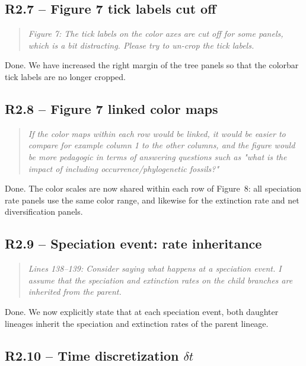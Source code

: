 \documentclass[11pt]{article}
\newenvironment{RC}{\begin{quote}\itshape}{\end{quote}}
\newcommand{\response}[1]{\noindent\textcolor{resp}{#1}\medskip}
\begin{document}
\subsection*{R2.7 -- Figure 7 tick labels cut off}

\begin{RC}
Figure 7: The tick labels on the color axes are cut off for some panels, which is a bit distracting. Please try to un-crop the tick labels.
\end{RC}

\response{Done. We have increased the right margin of the tree panels so that the colorbar tick labels are no longer cropped.}

\subsection*{R2.8 -- Figure 7 linked color maps}

\begin{RC}
If the color maps within each row would be linked, it would be easier to compare for example column 1 to the other columns, and the figure would be more pedagogic in terms of answering questions such as "what is the impact of including occurrence/phylogenetic fossils?"
\end{RC}

\response{Done. The color scales are now shared within each row of Figure~8: all speciation rate panels use the same color range, and likewise for the extinction rate and net diversification panels.}

\subsection*{R2.9 -- Speciation event: rate inheritance}

\begin{RC}
Lines 138--139: Consider saying what happens at a speciation event. I assume that the speciation and extinction rates on the child branches are inherited from the parent.
\end{RC}

\response{Done. We now explicitly state that at each speciation event, both daughter lineages inherit the speciation and extinction rates of the parent lineage.}

\subsection*{R2.10 -- Time discretization $\delta t$}
\end{document}
